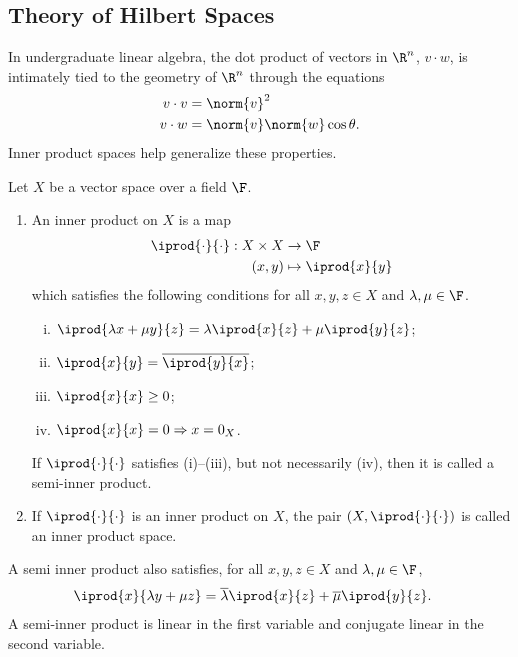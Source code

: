 \documentclass[10pt]{mypackage}
\begin{document}
\subsection{Theory of Hilbert Spaces}%
In undergraduate linear algebra, the dot product of vectors in $\R^n$, $v\cdot w$, is intimately tied to the geometry of $\R^n$ through the equations
\begin{align*}
  v\cdot v &= \norm{v}^2\\
  v\cdot w &= \norm{v}\norm{w}\cos\theta.
\end{align*}
Inner product spaces help generalize these properties.
\begin{definition}
  Let $X$ be a vector space over a field $\F$.
  \begin{enumerate}[(1)]
    \item An inner product on $X$ is a map 
      \begin{align*}
        \iprod{\cdot}{\cdot}: X\times X &\rightarrow \F\\
        \left(x,y\right) &\mapsto \iprod{x}{y}
      \end{align*}
      which satisfies the following conditions for all $x,y,z\in X$ and $\lambda,\mu\in \F$.
    \begin{enumerate}[(i)]
      \item $ \iprod{\lambda x + \mu y}{z} = \lambda \iprod{x}{z} + \mu \iprod{y}{z} $;
      \item $ \iprod{x}{y} = \overline{ \iprod{y}{x} } $;
      \item $ \iprod{x}{x} \geq 0 $;
      \item $ \iprod{x}{x} = 0 \Rightarrow x = 0_{X} $.
    \end{enumerate}
    If $ \iprod{\cdot}{\cdot} $ satisfies (i)--(iii), but not necessarily (iv), then it is called a semi-inner product.
  \item If $ \iprod{\cdot}{\cdot} $ is an inner product on $X$, the pair $\left(X, \iprod{\cdot}{\cdot}\right)$ is called an inner product space.
  \end{enumerate}
\end{definition}
\begin{remark}
  A semi inner product also satisfies, for all $x,y,z\in X$ and $\lambda,\mu \in \F$,
  \begin{align*}
    \iprod{x}{\lambda y + \mu z} &= \overline{\lambda} \iprod{x}{z} + \overline{\mu} \iprod{y}{z}.
  \end{align*}
  A semi-inner product is linear in the first variable and conjugate linear in the second variable.
\end{remark}
\end{document}

